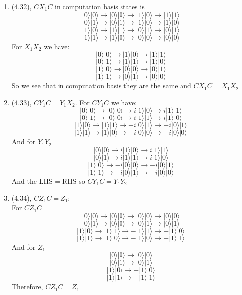 \documentclass[12pt]{article}
\newcommand{\ket}[1]{\vert{#1}\rangle}
\begin{document}
\begin{enumerate}
\begin{enumerate}
    \item (4.32), $C X_1 C$ in computation basis states is 
    $$ \ket{0} \ket{0} \rightarrow \ket{0} \ket{0} \rightarrow \ket{1} \ket{0} \rightarrow \ket{1}\ket{1} $$ 
    $$ \ket{0} \ket{1} \rightarrow \ket{0} \ket{1} \rightarrow \ket{1}\ket{0} \rightarrow \ket{1} \ket{0} $$
    $$ \ket{1} \ket{0} \rightarrow \ket{1}\ket{1} \rightarrow \ket{0} \ket{1} \rightarrow \ket{0} \ket{1} $$
    $$ \ket{1} \ket{1} \rightarrow \ket{1} \ket{0} \rightarrow \ket{0} \ket{0} \rightarrow \ket{0} \ket{0} $$
    For $X_1 X_2$ we have:
    $$\ket{ 0} \ket{0} \rightarrow \ket{1} \ket{0} \rightarrow \ket{1} \ket{1} $$
    $$ \ket{0} \ket{1} \rightarrow \ket{1} \ket{1} \rightarrow \ket{1}\ket{0} $$
    $$ \ket{1} \ket{0} \rightarrow \ket{0} \ket{0} \rightarrow \ket{0}\ket{1} $$
    $$ \ket{1}\ket{1} \rightarrow \ket{0} \ket{1} \rightarrow \ket{0} \ket{0} $$
    So we see that in computation basis they are the same and $C X_1 C = X_1 X_2$ 
    
    \item (4.33), $C Y_1 C = Y_1 X_2 $. For $C Y_1 C$ we have:
    $$ \ket{0} \ket{0} \rightarrow \ket{0} \ket{0} \rightarrow i \ket{1} \ket{0} \rightarrow i \ket{1} \ket{1} $$
    $$ \ket{0} \ket{1} \rightarrow \ket{0} \ket{0} \rightarrow i \ket{1} \ket{1} \rightarrow i \ket{1} \ket{0} $$ 
    $$ \ket{1} \ket{0} \rightarrow \ket{1} \ket{1} \rightarrow -i \ket{0} \ket{1} \rightarrow -i \ket{0} \ket{1} $$
    $$ \ket{1} \ket{1} \rightarrow \ket{1} \ket{0} \rightarrow -i \ket{0} \ket{0} \rightarrow -i \ket{0} \ket{0} $$
    And for $Y_1 Y_2 $
    $$ \ket{0} \ket{0} \rightarrow i \ket{1} \ket{0} \rightarrow i \ket{1} \ket{1} $$
    $$ \ket{0} \ket{1} \rightarrow i \ket{1} \ket{1} \rightarrow i \ket{1} \ket{0} $$
    $$ \ket{1} \ket{0} \rightarrow -i \ket{0} \ket{0} \rightarrow -i \ket{0} \ket{1} $$
    $$ \ket{1} \ket{1} \rightarrow -i \ket{0} \ket{1} \rightarrow -i \ket{0} \ket{0} $$
    And the LHS = RHS so $C Y_1 C = Y_1 Y_2 $
    \item (4.34), $C Z_1 C = Z_1$: \\
    For $C Z_1 C$ 
    $$ \ket{0} \ket{0} \rightarrow \ket{0} \ket{0} \rightarrow \ket{0} \ket{0} \rightarrow \ket{0}\ket{0} $$
    $$ \ket{0} \ket{1} \rightarrow \ket{0} \ket{0} \rightarrow  \ket{0} \ket{1} \rightarrow \ket{0} \ket{1} $$
    $$ \ket{1} \ket{0} \rightarrow \ket{1} \ket{1} \rightarrow - \ket{1} \ket{1} \rightarrow - \ket{1} \ket{0} $$
    $$ \ket{1}\ket{1} \rightarrow \ket{1} \ket{0} \rightarrow - \ket{1} \ket{0} \rightarrow - \ket{1} \ket{1} $$
    And for $Z_1$ 
    $$ \ket{0} \ket{0} \rightarrow \ket{0} \ket{0} $$
    $$ \ket{0} \ket{1} \rightarrow \ket{0} \ket{1} $$
    $$ \ket{1} \ket{0} \rightarrow - \ket{1} \ket{0} $$
    $$ \ket{1} \ket{1} \rightarrow - \ket{1} \ket{1} $$
    Therefore, $C Z_1 C = Z_1 $


\end{enumerate}
\end{enumerate}
\end{document}
